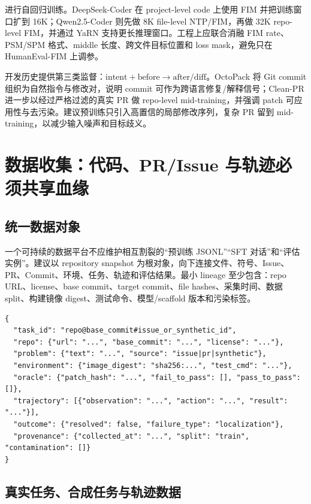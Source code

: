 \documentclass[10pt,a4paper,UTF8,fontset=none]{ctexart}
\newcommand{\ident}[1]{{\rmfamily #1}}
\begin{document}
进行自回归训练。DeepSeek-Coder 在 project-level code 上使用 FIM 并把训练窗口扩到 16K\cite{zh:guo2024deepseekcoder}；Qwen2.5-Coder 则先做 8K file-level NTP/FIM，再做 32K repo-level FIM，并通过 YaRN 支持更长推理窗口\cite{zh:hui2024qwen25coder}。工程上应联合消融 FIM rate、PSM/SPM 格式、middle 长度、跨文件目标位置和 loss mask，避免只在 HumanEval-FIM 上调参。

开发历史提供第三类监督：$\text{intent} + \text{before} \rightarrow \text{after/diff}$。OctoPack 将 Git commit 组织为自然指令与修改对，说明 commit 可作为跨语言修复/解释信号\cite{zh:muennighoff2023octopack}；Clean-PR 进一步以经过严格过滤的真实 PR 做 repo-level mid-training，并强调 patch 可应用性与去污染\cite{zh:lo2026cleanpr}。建议预训练只引入高置信的局部修改序列，复杂 PR 留到 mid-training，以减少输入噪声和目标歧义。

\section{数据收集：代码、PR/Issue 与轨迹必须共享血缘}

\subsection{统一数据对象}

一个可持续的数据平台不应维护相互割裂的“预训练 JSONL”“SFT 对话”和“评估实例”。建议以 \ident{repository snapshot} 为根对象，向下连接文件、符号、Issue、PR、Commit、环境、任务、轨迹和评估结果。最小 lineage 至少包含：repo URL、license、base commit、target commit、file hashes、采集时间、数据 split、构建镜像 digest、测试命令、模型/scaffold 版本和污染标签。

\begin{lstlisting}[style=codeblock,caption={建议的统一任务与轨迹记录（示意）},label={zh:lst:schema}]
{
  "task_id": "repo@base_commit#issue_or_synthetic_id",
  "repo": {"url": "...", "base_commit": "...", "license": "..."},
  "problem": {"text": "...", "source": "issue|pr|synthetic"},
  "environment": {"image_digest": "sha256:...", "test_cmd": "..."},
  "oracle": {"patch_hash": "...", "fail_to_pass": [], "pass_to_pass": []},
  "trajectory": [{"observation": "...", "action": "...", "result": "..."}],
  "outcome": {"resolved": false, "failure_type": "localization"},
  "provenance": {"collected_at": "...", "split": "train", "contamination": []}
}
\end{lstlisting}

\subsection{真实任务、合成任务与轨迹数据}
\end{document}
